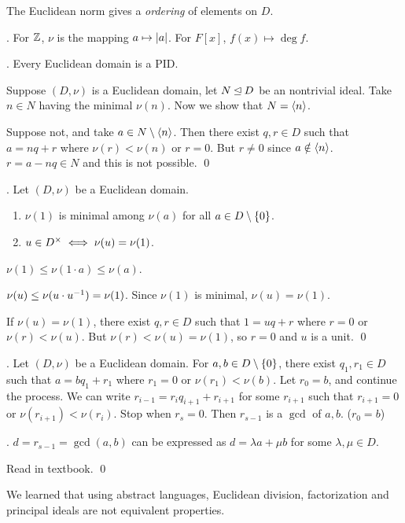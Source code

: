 The Euclidean norm gives a \textit{ordering} of elements on \(D\).

\ex. For \(\mathbb{Z}\), \(\nu\) is the mapping \(a \mapsto \left| a \right|\). For \(F[x]\), \(f(x) \mapsto \deg f\).

\thm. Every Euclidean domain is a PID.

\pf Suppose \((D, \nu)\) is a Euclidean domain, let \(N \unlhd D\) be an nontrivial ideal. Take \(n \in N\) having the minimal \(\nu(n)\). Now we show that \(N = \left\langle n \right\rangle\).

Suppose not, and take \(a \in N \setminus \left\langle n \right\rangle\). Then there exist \(q, r \in D\) such that \(a = nq + r\) where \(\nu(r) < \nu(n)\) or \(r = 0\). But \(r \neq 0\) since \(a \notin \left\langle n \right\rangle\). \(r = a - nq \in N\) and this is not possible. \qed

\thm. Let \((D, \nu)\) be a Euclidean domain.
\begin{enumerate}
    \item \(\nu(1)\) is minimal among \(\nu(a)\) for all \(a \in D \setminus \{0\}\).
    \item \(u \in D^\times \iff \nu(u) = \nu(1)\).
\end{enumerate}

\pf {} \(\nu(1) \leq \nu(1 \cdot a) \leq \nu(a)\).

 \note{\mimp} \(\nu(u) \leq \nu(u \cdot u ^{-1}) = \nu(1)\). Since \(\nu(1)\) is minimal, \(\nu(u) = \nu(1)\).

\note{\mimpd} If \(\nu(u) = \nu(1)\), there exist \(q, r \in D\) such that \(1 = uq + r\) where \(r = 0\) or \(\nu(r) < \nu(u)\). But \(\nu(r) < \nu(u) = \nu(1)\), so \(r = 0\) and \(u\) is a unit. \qed

\thm.  Let \((D, \nu)\) be a Euclidean domain. For \(a, b \in D \setminus \{0\}\), there exist \(q_1, r_1 \in D\) such that \(a = bq_1 + r_1\) where \(r_1 = 0\) or \(\nu(r_1) < \nu(b)\). Let \(r_0 = b\), and continue the process. We can write \(r_{i-1} = r_i q_{i+1} + r_{i+1}\) for some \(r_{i+1}\) such that \(r_{i+1} = 0\) or \(\nu(r_{i+1}) < \nu(r_{i})\). Stop when \(r_s = 0\). Then \(r_{s-1}\) is a \(\gcd\) of \(a, b\). (\(r_0 = b\))

\cor. \(d = r_{s-1} = \gcd(a, b)\) can be expressed as \(d = \lambda a + \mu b\) for some \(\lambda, \mu \in D\).

\pf Read in textbook. \qed

We learned that using abstract languages, Euclidean division, factorization and principal ideals are not equivalent properties.

